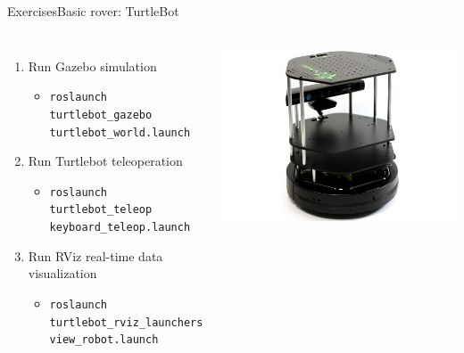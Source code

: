 \documentclass[10pt,compress]{beamer} %
\begin{document}
\begin{frame}{Exercises}{Basic rover: TurtleBot}
	\begin{columns}
	\begin{enumerate}
		\item Run Gazebo simulation
			\begin{itemize}
			\item \texttt{roslaunch turtlebot\_gazebo turtlebot\_world.launch}
			\end{itemize}
	\item Run Turtlebot teleoperation
			\begin{itemize}
			\item \texttt{roslaunch turtlebot\_teleop keyboard\_teleop.launch}
			\end{itemize}
	\item Run RViz real-time data visualization 
			\begin{itemize}
			\item \texttt{roslaunch turtlebot\_rviz\_launchers view\_robot.launch}
			\end{itemize}
	\end{enumerate}

		\centering\includegraphics[width=\linewidth]{figs/turtlebot.jpg}
	\end{columns}
\end{frame}
\end{document}
